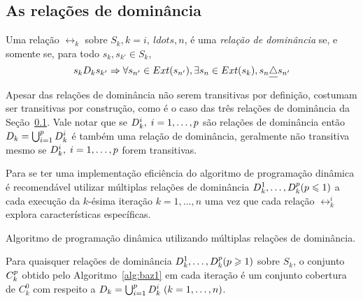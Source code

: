 \subsection{As relações de dominância}
\label{sec:domrel}


\begin{mydef}
Uma relação $\rel_k$ sobre $S_k, k = i,\ ldots, n$, é uma \emph{relação de dominância}
se, e somente se, para todo $s_k, s_{k'} \in S_k$,
\begin{equation}
  s_k D_k s_{{k'}} \Rightarrow \forall s_{{n'}} \in Ext(s_{{n'}}),
    \exists s_n \in Ext(s_k), s_n \underline{\triangle} s_{{n'}}
  \label{eq:domrel}
\end{equation}
\label{def:domrel}
\end{mydef}

Apesar das relações de dominância não serem transitivas por definição,
costumam ser transitivas por construção, como é o caso
das três relações de dominância da Seção~\ref{sec:domrel}.
Vale notar que se $D_k^i, \; i = 1, \ldots, p$ são relações de dominância
então $D_k = \bigcup^{p}_{i = 1} D_k^i$ é também uma relação
de dominância, geralmente não transitiva mesmo se $D_k^i, \; i = 1, \ldots, p$
forem transitivas.

Para se ter uma implementação eficiência do algoritmo de programação dinâmica
é recomendável utilizar múltiplas relações de dominância
$D_k^1, \ldots, D_k^p (p \leqslant 1)$ a cada execução da $k$-ésima iteração
$k = 1, \ldots, n$ uma vez que cada relação $\rel_k^i$ explora características
específicas.

\begin{algorithm}
  \caption{Algoritmo de programação dinâmica utilizando múltiplas relações de dominância.}
  \label{alg:baz1}
  
\end{algorithm}

\begin{myprop}
  Para quaisquer relações de dominância $D_k^1, \ldots, D_k^p (p \geqslant 1)$
  sobre $S_k$, o conjunto $C_k^p$ obtido pelo Algoritmo~\ref{alg:baz1}
  em cada iteração é um conjunto cobertura de $C_k^0$ com respeito a
  $D_k = \bigcup_{i=1}^p D_k^i \; (k = 1, \ldots, n)$.
  \label{prop:coverset}
\end{myprop}

